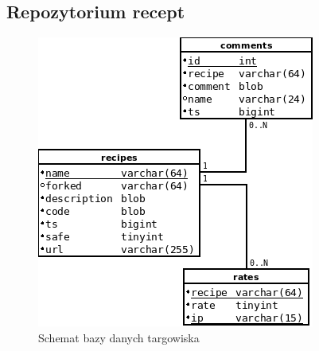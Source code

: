 \documentclass[11pt,a4paper,polish,thesis]{dcsbook}
\begin{document}
\subsection{Repozytorium recept}
\begin{figure}[p]
  \centering
  \includegraphics[scale=0.7]{./resources/market_db.png}
  \caption{Schemat bazy danych targowiska}
  \label{fig:market_db}
\end{figure}
\end{document}
